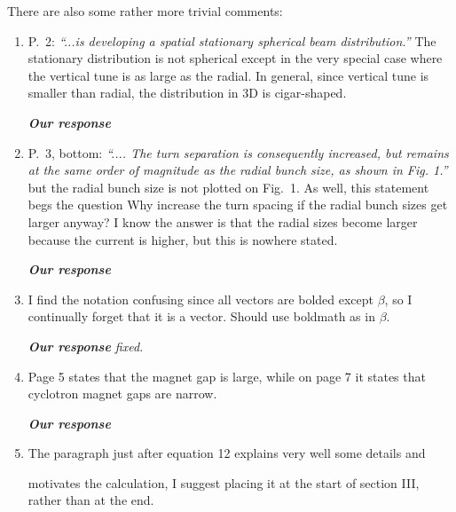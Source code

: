 \documentclass[10pt]{report}
\begin{document}
 There are also some rather more trivial comments:
 
 \begin{enumerate}
  \item P.\ 2: \textit{``...is developing a spatial
 stationary spherical beam distribution.''} The stationary distribution is not
 spherical except in the very special case where the vertical tune is as large
 as the radial. In general, since vertical tune is smaller than radial, the
 distribution in 3D is cigar-shaped.


 \vspace{+2mm}
 {\it {\bf Our response}  
 }
 \vspace{+2mm}

 
  \item P.\ 3, bottom: \textit{``.... The turn separation is consequently
 increased, but 
 remains at the same order of magnitude 
 as the radial bunch size, as shown in Fig. 1.''} but the radial bunch size is 
 not plotted on Fig.\ 1. As well, this statement begs the question Why increase
 the turn spacing if the radial bunch sizes get larger anyway? I know the answer
 is that the radial sizes become larger because the current is higher, but this
 is nowhere stated. 


 \vspace{+2mm}
 {\it {\bf Our response}  
 }
 \vspace{+2mm}

 
  \item I find the notation confusing since all vectors are bolded except
 $\beta$, so I
 continually forget that it is a vector. Should use boldmath as in {\boldmath
 $\beta$}.
 
 \vspace{+2mm}
 {\it {\bf Our response} fixed.
 }
 \vspace{+2mm}
 

  \item Page 5 states that the magnet gap is large, while on page 7 it states
 that 
 cyclotron magnet gaps are narrow.


 \vspace{+2mm}
 {\it {\bf Our response}  
 }
 \vspace{+2mm}
 
  \item The paragraph just after equation 12 explains very well some details and
 
 motivates the calculation, I suggest placing it at the start of section III,
 rather than at the end.



\end{enumerate}
\end{document}

